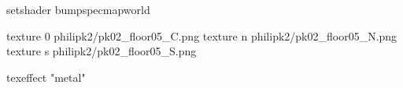 setshader bumpspecmapworld

texture 0 philipk2/pk02_floor05_C.png
texture n philipk2/pk02_floor05_N.png
texture s philipk2/pk02_floor05_S.png

texeffect "metal"
